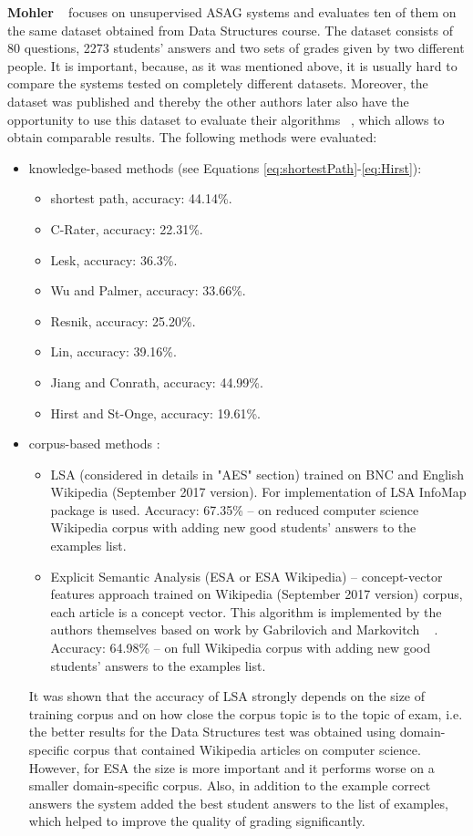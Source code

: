 \textbf{Mohler} ~\cite{Mohler} focuses on unsupervised ASAG systems and evaluates ten of them on the same dataset obtained from  Data Structures course. The dataset consists of 80 questions, 2273 students' answers and two sets of grades given by two different people. It is important, because, as it was mentioned above, it is usually hard to compare the  systems tested on completely different datasets. Moreover, the dataset was published and thereby the other authors later also have the opportunity to use this dataset to evaluate their algorithms ~\cite{Sultan}, which allows to obtain comparable results. The following methods were evaluated: 
\begin{itemize}
	\item knowledge-based methods (see Equations \ref{eq:shortestPath}-\ref{eq:Hirst}):
	\begin{itemize}
	\item shortest path, accuracy: 44.14\%.
	\item C-Rater, accuracy: 22.31\%.
	\item Lesk, accuracy: 36.3\%.
	\item Wu and Palmer, accuracy: 33.66\%.
	\item Resnik, accuracy: 25.20\%.
	\item Lin, accuracy: 39.16\%.
	\item Jiang and Conrath, accuracy: 44.99\%.
	\item Hirst and St-Onge, accuracy: 19.61\%.
	\end{itemize}
	\item corpus-based methods :
	\begin{itemize}
		\item LSA (considered in details in "AES" section) trained on BNC and English Wikipedia (September 2017 version). For implementation of LSA InfoMap 			package is used. Accuracy: 67.35\% -- on reduced computer science Wikipedia corpus with adding new good students' answers to the examples list.
		\item Explicit Semantic Analysis (ESA or ESA Wikipedia) -- concept-vector features approach trained on Wikipedia (September 2017 version) corpus, 				each article is a concept vector. This algorithm is implemented by the authors themselves based on work by Gabrilovich and Markovitch ~							\cite{Gabrilovich}. Accuracy: 64.98\% -- on full Wikipedia corpus with adding new good students' answers to the examples list.
	\end{itemize}
	It was shown that the accuracy of LSA strongly depends on the size of training corpus and on how close the corpus topic is to the topic of exam, i.e. 	the better results for the Data Structures test was obtained using domain-specific corpus that contained Wikipedia articles on computer science. 			However, for ESA the size is more important and it performs worse on a smaller domain-specific corpus. Also, in addition to the example correct 			answers the system added the best student answers to the list of examples, which helped to improve the quality of grading significantly. 
\end{itemize}

